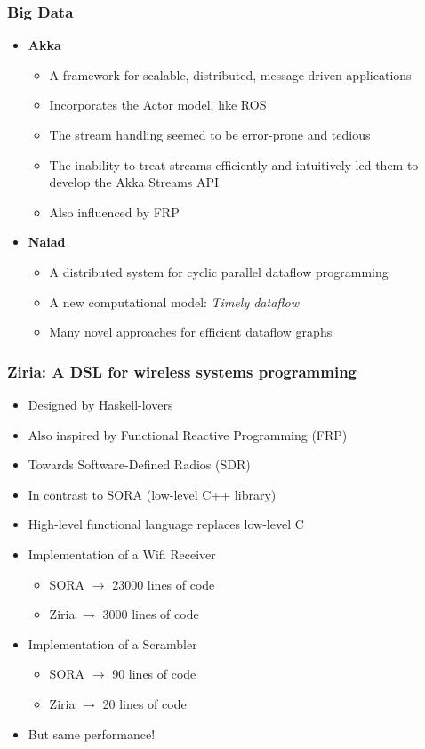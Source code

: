 \documentclass[hyperref={pdfpagelayout=SinglePage}]{beamer}
\newenvironment{mysubsec}[1]
{   \begin{frame}
	\frametitle{#1} }
{ \end{frame} }
\begin{document}
	\begin{mysubsec}{Big Data}
		\begin{itemize}
		\item \textbf{Akka}
			\begin{itemize}
			\item A framework for scalable, distributed, message-driven applications
			\item Incorporates the Actor model, like ROS
			\item The stream handling seemed to be error-prone and tedious
			\item The inability to treat streams efficiently and intuitively led them to develop the Akka Streams API
			\item Also influenced by FRP
			\end{itemize}
		\framebreak
		\item \textbf{Naiad}
			\begin{itemize}
			\item A distributed system for cyclic parallel dataflow programming
			\item A new computational model: \textit{Timely dataflow}
			\item Many novel approaches for efficient dataflow graphs
			\end{itemize}
		\end{itemize}
	\end{mysubsec}
	\begin{mysubsec}{Ziria: A DSL for wireless systems programming}  
		\begin{itemize}
			\item Designed by Haskell-lovers
			\item Also inspired by Functional Reactive Programming (FRP)
			\item Towards Software-Defined Radios (SDR)
			\item In contrast to SORA (low-level C++ library)
			\item High-level functional language replaces low-level C
			\item Implementation of a Wifi Receiver
			\begin{itemize}
				\item SORA $\rightarrow$ 23000 lines of code
				\item Ziria $\rightarrow$ 3000 lines of code
			\end{itemize}
			\item Implementation of a Scrambler
			\begin{itemize}
				\item SORA $\rightarrow$  90 lines of code
				\item Ziria $\rightarrow$ 20 lines of code
			\end{itemize}
			\item But same performance!
		\end{itemize}	
	\end{mysubsec}	
\end{document}
